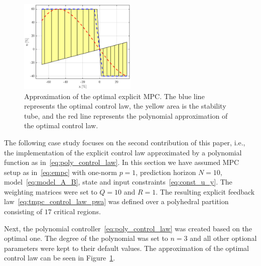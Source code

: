 \documentclass[letterpaper, 10 pt, conference]{ieeeconf}
\newcommand{\polydegree}{n}
\begin{document}
	\begin{figure}[bp!]
		\begin{center}
			\includegraphics[width=0.5\textwidth]{images/approximation.eps}
			\caption{Approximation of the optimal explicit MPC. The blue line represents the optimal control law, the yellow area is the stability tube, and the red line represents the polynomial approximation of the optimal control law.}
			\label{fig:approx}
		\end{center}
	\end{figure}
	
	The following case study focuses on the second contribution of this paper, i.e., the implementation of the explicit control law approximated by a polynomial function as in~\eqref{eq:poly_control_law}. 
	In this section we have assumed MPC setup as in~\eqref{eq:empc} with one-norm $p = 1$, prediction horizon $N = 10$, model~\eqref{eq:model_A_B}, state and input constraints~\eqref{eq:const_u_y}. The weighting matrices were set to $Q = 10$ and $R = 1$.
	The resulting explicit feedback law~\eqref{eq:tmpc_control_law_pwa} was defined over a polyhedral partition consisting of $17$ critical regions.
	
	Next, the polynomial controller~\eqref{eq:poly_control_law} was created based on the optimal one. The degree of the polynomial was set to $\polydegree = 3$ and all other optional parameters were kept to their default values. The approximation of the optimal control law can be seen in Figure~\ref{fig:approx}.
	
	
	
	
	
\end{document}
